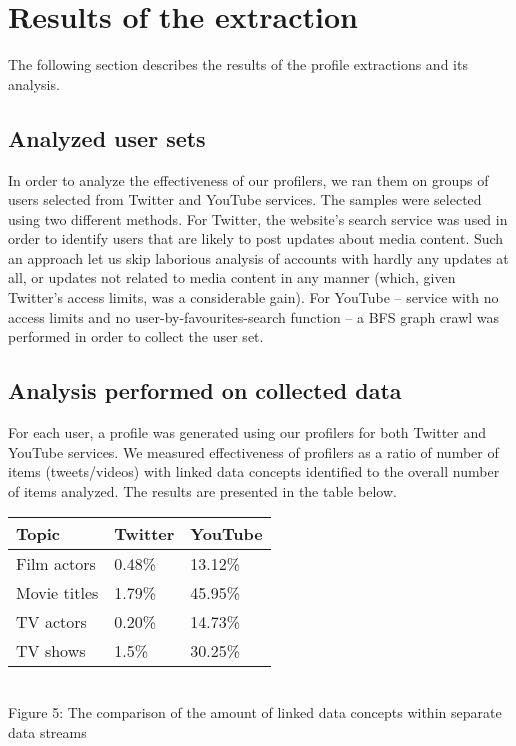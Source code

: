 \section{Results of the extraction}

The following section describes the results of the profile extractions and its
analysis.

\subsection{Analyzed user sets}
In order to analyze the effectiveness of our profilers, we ran them on groups of
users selected from Twitter and YouTube services. The samples were selected
using two different methods. For Twitter, the website's search service was used
in order to identify users that are likely to post updates about media content.
Such an approach let us skip laborious analysis of accounts with hardly any
updates at all, or updates not related to media content in any manner (which,
given Twitter's access limits, was a considerable gain). For YouTube -- service
with no access limits and no user-by-favourites-search function -- a BFS graph
crawl was performed in order to collect the user set.

\subsection{Analysis performed on collected data}

For each user, a profile was generated using our profilers for both Twitter and
YouTube services. We measured effectiveness of profilers as a ratio of number of
items (tweets/videos) with linked data concepts identified to the overall number
of items analyzed. The results are presented in the table below.

\begin{center}
  \begin{tabular}{| l | l | l |}
  Topic & Twitter & YouTube \\ \hline
  Film actors & 0.48\% & 13.12\% \\
  Movie titles & 1.79\% & 45.95\% \\
  TV actors & 0.20\% & 14.73\% \\
  TV shows & 1.5\% & 30.25\% \\
  \end{tabular} \\
  Figure 5: The comparison of the amount of linked data concepts within separate data streams \\
\end{center}

